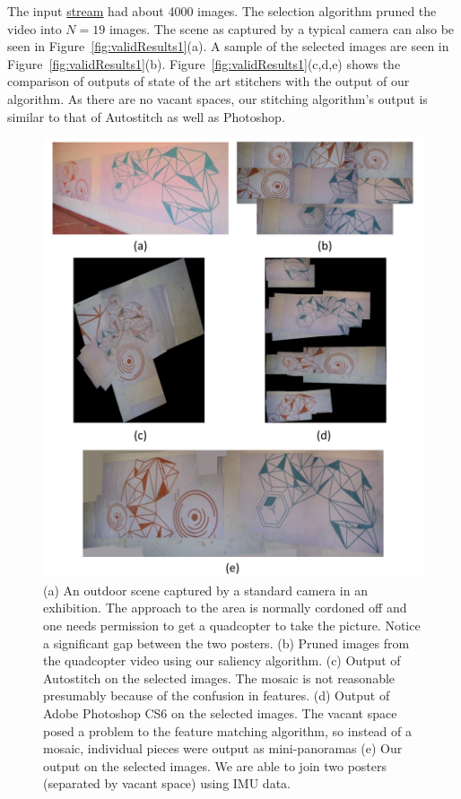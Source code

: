 \documentclass[10pt,twocolumn,letterpaper]{article}
\begin{document}
The input \href{videos/longwall.avi}{stream} had about 4000 images. The
selection algorithm pruned the video into $N=19$ images.
The scene as captured by a typical camera  can also be seen in
Figure~\ref{fig:validResults1}(a). A sample of the
selected images are seen in Figure~\ref{fig:validResults1}(b).
Figure~\ref{fig:validResults1}(c,d,e) shows the comparison of outputs of state
of the art stitchers with the output of our algorithm. As there are no vacant
spaces, our stitching algorithm's output is similar to that of Autostitch as
well as Photoshop.

\begin{figure}[h!]
\centering
\includegraphics[width=0.85\linewidth]{figures/orange_blue.pdf}
\caption{(a) An outdoor scene captured by a standard camera in an
  exhibition. The approach to the area is normally cordoned off and one
  needs permission to get a quadcopter to take the picture.  Notice a
  significant gap between the two posters.  (b) Pruned images from the
  quadcopter video using our saliency algorithm. (c) Output of
  Autostitch on the selected images. The mosaic is not reasonable
  presumably because of the confusion in features. (d) Output of Adobe
  Photoshop CS6 on the selected images. The vacant space posed a
  problem to the feature matching algorithm, so instead of a mosaic,
  individual pieces were output as mini-panoramas (e) Our output on
  the selected images. We are able to join two posters (separated by
  vacant space) using IMU data.}
\label{fig:results1}
\end{figure}
\end{document}

